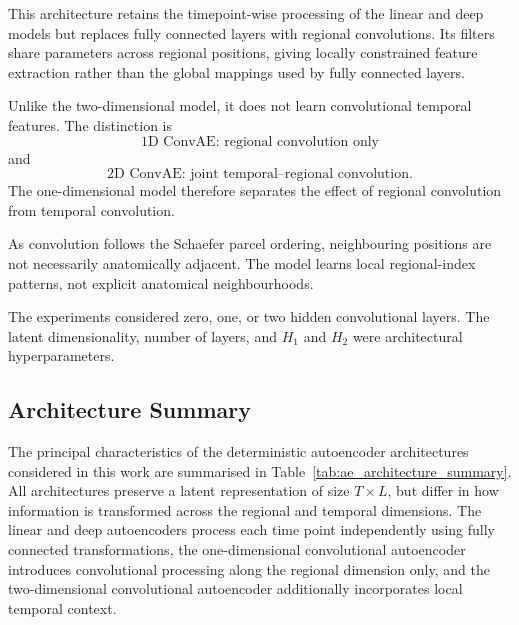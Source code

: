 This architecture retains the timepoint-wise processing of the linear and
deep models but replaces fully connected layers with regional
convolutions. Its filters share parameters across regional positions,
giving locally constrained feature extraction rather than the global
mappings used by fully connected layers.

Unlike the two-dimensional model, it does not learn convolutional
temporal features. The distinction is
\[
\text{1D ConvAE: regional convolution only}
\]
and
\[
\text{2D ConvAE: joint temporal--regional convolution}.
\]
The one-dimensional model therefore separates the effect of regional
convolution from temporal convolution.

As convolution follows the Schaefer parcel ordering, neighbouring
positions are not necessarily anatomically adjacent. The model learns
local regional-index patterns, not explicit anatomical neighbourhoods.

The experiments considered zero, one, or two hidden convolutional
layers. The latent dimensionality, number of layers, and $H_1$ and $H_2$
were architectural hyperparameters.

\subsection{Architecture Summary}

The principal characteristics of the deterministic autoencoder architectures
considered in this work are summarised in Table~\ref{tab:ae_architecture_summary}.
All architectures preserve a latent representation of size $T\times L$, but
differ in how information is transformed across the regional and temporal
dimensions. The linear and deep autoencoders process each time point
independently using fully connected transformations, the one-dimensional
convolutional autoencoder introduces convolutional processing along the
regional dimension only, and the two-dimensional convolutional autoencoder
additionally incorporates local temporal context.

